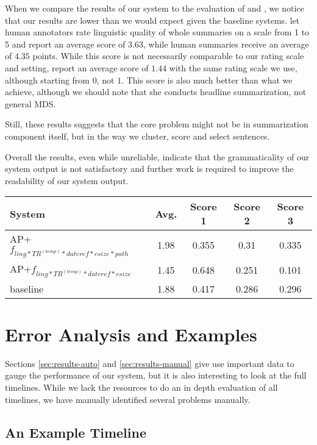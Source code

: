\documentclass[a4paper,BCOR=10mm]{report}
\numberwithin{lemma}{chapter}
\numberwithin{definition}{chapter}
\begin{document}
When we compare the results of our system to the evaluation of \citet{banerjee} and \citet{filippova}, we notice that our results are lower than we would expect given the baseline systems. \citet{banerjee} let human annotators rate linguistic quality of whole summaries on a scale from 1 to 5 and report an average score of $3.63$, while human summaries receive an average of $4.35$ points.
While this score is not necessarily comparable to our rating scale and setting, \citet{filippova} report an average score of $1.44$ with the same rating scale we use, although starting from $0$, not $1$. This score is also much better than what we achieve, although we should note that she conducts headline summarization, not general MDS.

Still, these results suggests that the core problem might not be in summarization component itself, but in the way we cluster, score and select sentences.

Overall the results, even while unreliable, indicate that the grammaticality of our system output is not satisfactory and further work is required to improve the readability of our system output.

\begin{table}
\begin{tabular}{|l|c|ccc|}
System & Avg. & Score 1 & Score 2 & Score 3 \\\hline
AP+$f_{ ling*TR^{(temp)}*\mathit{dateref}*\mathit{csize} * \mathit{path}}$ & 1.98 & 0.355 & 0.31 & 0.335 \\
AP+$f_{ ling*TR^{(temp)}*\mathit{dateref}*\mathit{csize}}$ & 1.45 & 0.648 & 0.251 & 0.101 \\
baseline & 1.88 & 0.417 & 0.286 & 0.296 \\
\end{tabular}

\end{table}

\chapter{Error Analysis and Examples}  \label{sec:errors}

Sections \ref{sec:results-auto} and \ref{sec:results-manual} give use important data to gauge the performance of our system, but it is also interesting to look at the full timelines.
While we lack the resources to do an in depth evaluation of all timelines, we have manually identified several problems manually.

\section{An Example Timeline}
\end{document}
